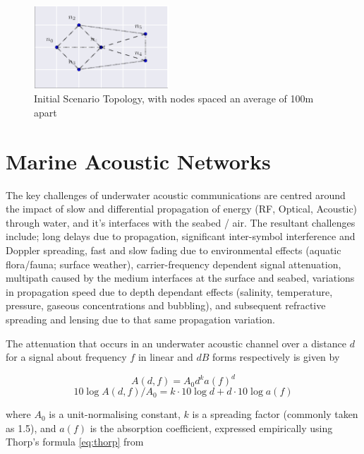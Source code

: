 \documentclass[runningheads,a4paper]{llncs}
\begin{document}
\begin{figure}[h]
  \centering
  \includegraphics[width=0.45\textwidth]{img/s1_layout.pdf}
  \caption{Initial Scenario Topology, with nodes spaced an average of 100m apart}
  \label{fig:s1_layout}
\end{figure}

\section{Marine Acoustic Networks}\label{sec:marineacousticnetworks}

The key challenges of underwater acoustic communications are centred around the impact of slow and differential propagation of energy (RF, Optical, Acoustic) through water, and it's interfaces with the seabed / air.
The resultant challenges include; long delays due to propagation, significant inter-symbol interference and Doppler spreading, fast and slow fading due to environmental effects (aquatic flora/fauna; surface weather), carrier-frequency dependent signal attenuation, multipath caused by the medium interfaces at the surface and seabed, variations in propagation speed due to depth dependant effects (salinity, temperature, pressure, gaseous concentrations and bubbling), and subsequent refractive spreading and lensing due to that same propagation variation\cite{Partan2006}.

The attenuation that occurs in an underwater acoustic channel over a distance $d$ for a signal about frequency $f$ in linear and $dB$ forms respectively is given by

\begin{equation}
  \label{eq:acoattenuation}
  A(d,f) = A_0d^ka(f)^d
\end{equation}
\begin{equation}
  \label{eq:acoattenuationdb}
  10 \log A(d,f)/A_0 = k \cdot 10 \log d + d \cdot 10 \log a(f)
\end{equation}

where $A_0$ is a unit-normalising constant, $k$ is a spreading factor (commonly taken as 1.5), and $a(f)$ is the absorption coefficient, expressed empirically using Thorp's formula \eqref{eq:thorp} from \cite{Stojanovic2007}
\end{document}
